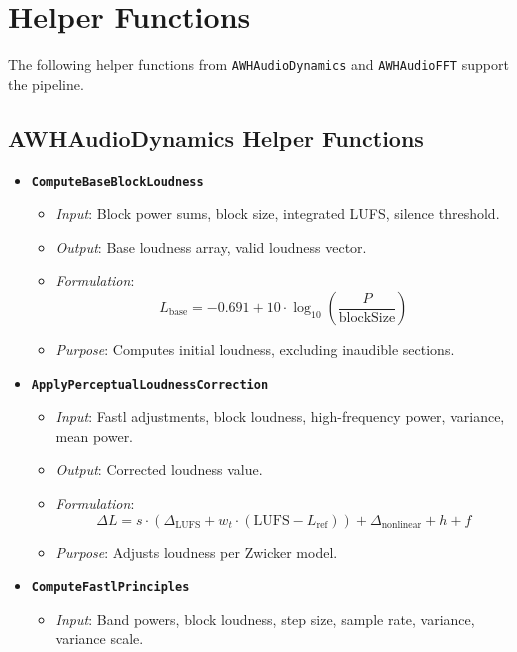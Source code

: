 \documentclass[11pt]{article}
\begin{document}
\section{Helper Functions}
The following helper functions from \texttt{AWHAudioDynamics} and \texttt{AWHAudioFFT} support the pipeline.

\subsection{AWHAudioDynamics Helper Functions}
\begin{itemize}[label=$\bullet$]
  \item \textbf{\texttt{ComputeBaseBlockLoudness}}
    \begin{itemize}
      \item \textit{Input}: Block power sums, block size, integrated LUFS, silence threshold.
      \item \textit{Output}: Base loudness array, valid loudness vector.
      \item \textit{Formulation}:
        \begin{equation}
        L_{\text{base}} = -0.691 + 10 \cdot \log_{10}\left(\frac{P}{\text{blockSize}}\right)
        \end{equation}
      \item \textit{Purpose}: Computes initial loudness, excluding inaudible sections.
    \end{itemize}
  \item \textbf{\texttt{ApplyPerceptualLoudnessCorrection}}
    \begin{itemize}
      \item \textit{Input}: Fastl adjustments, block loudness, high-frequency power, variance, mean power.
      \item \textit{Output}: Corrected loudness value.
      \item \textit{Formulation}:
        \begin{equation}
        \Delta L = s \cdot (\Delta_{\text{LUFS}} + w_t \cdot (\text{LUFS} - L_{\text{ref}})) + \Delta_{\text{nonlinear}} + h + f
        \end{equation}
      \item \textit{Purpose}: Adjusts loudness per Zwicker model.
    \end{itemize}
  \item \textbf{\texttt{ComputeFastlPrinciples}}
    \begin{itemize}
      \item \textit{Input}: Band powers, block loudness, step size, sample rate, variance, variance scale.

\end{itemize}
\end{itemize}
\end{document}

